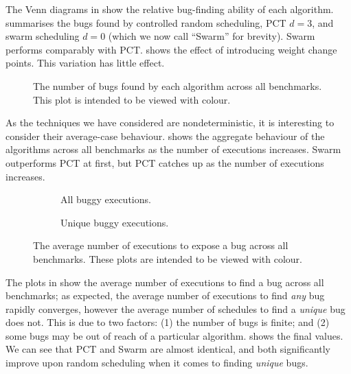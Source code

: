 The Venn diagrams in  show the relative bug-finding
ability of each algorithm.   summarises the bugs
found by controlled random scheduling, PCT $d=3$, and swarm scheduling
$d=0$ (which we now call ``Swarm'' for brevity).  Swarm performs
comparably with PCT.   shows the effect of
introducing weight change points.  This variation has little effect.

\begin{figure}
  \centering
  
  \caption[Plot of bugs found by each scheduling algorithm.]{The number of bugs found by each algorithm across all benchmarks.  This plot is intended to be viewed with colour.}\label{fig:totalbugs}
\end{figure}

As the techniques we have considered are nondeterministic, it is
interesting to consider their average-case behaviour.
 shows the aggregate behaviour of the algorithms
across all benchmarks as the number of executions increases.  Swarm
outperforms PCT at first, but PCT catches up as the number of
executions increases.

\begin{figure}
  \centering
  \begin{subfigure}{0.49\textwidth}
    \centering
    \resizebox{\textwidth}{!}{}
    \caption{All buggy executions.}\label{fig:freqbugs-total}
  \end{subfigure}
  \begin{subfigure}{0.49\textwidth}
    \centering
    \resizebox{\textwidth}{!}{}
    \caption{Unique buggy executions.}\label{fig:freqbugs-unique}
  \end{subfigure}
  \caption[Plot of average number of executions needed to expose a bug.]{The average number of executions to expose a bug across all benchmarks.  These plots are intended to be viewed with colour.}\label{fig:freqbugs}
\end{figure}

The plots in  show the average number of executions
to find a bug across all benchmarks; as expected, the average number
of executions to find \emph{any} bug rapidly converges, however the
average number of schedules to find a \emph{unique} bug does not.
This is due to two factors: (1) the number of bugs is finite; and (2)
some bugs may be out of reach of a particular algorithm.
 shows the final values.  We can see that PCT and
Swarm are almost identical, and both significantly improve upon random
scheduling when it comes to finding \emph{unique} bugs.

